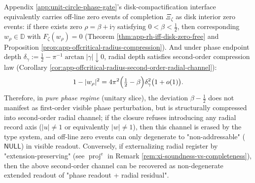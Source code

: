 \begin{corollary}\label{cor:xi-null-second-order-radial-channel}
Appendix \ref{app:unit-circle-phase-gate}'s disk-compactification interface equivalently carries off-line zero events of completion \(\Xi_\zeta\) as disk interior zero events: if there exists zero \(\rho=\beta+\mathrm{i}\gamma\) satisfying \(0<\beta<\tfrac12\), then corresponding \(w_\rho\in\mathbb{D}\) with \(F_\zeta(w_\rho)=0\) (Theorem \ref{thm:app-rh-iff-disk-zero-free} and Proposition \ref{prop:app-offcritical-radius-compression}).
And under phase endpoint depth \(\delta_\gamma:=\tfrac12-\pi^{-1}\arctan|\gamma|\downarrow 0\), radial depth satisfies second-order compression law (Corollary \ref{cor:app-offcritical-radius-second-order-radial-channel}):
\[
1-|w_\rho|^{2}=4\pi^{2}\Bigl(\tfrac12-\beta\Bigr)\delta_\gamma^{2}\bigl(1+o(1)\bigr).
\]
Therefore, in \emph{pure phase regime} (unitary slice), the deviation \(\beta-\tfrac12\) does not manifest as first-order visible phase perturbation, but is structurally compressed into second-order radial channel; if the closure refuses introducing any radial record axis (\(|u|\neq 1\) or equivalently \(|w|\neq 1\)), then this channel is erased by the type system, and off-line zero events can only degenerate to "non-addressable" (\(\mathsf{NULL}\)) in visible readout.
Conversely, if externalizing radial register by "extension-preserving" (see \(\operatorname{proj}^{\mathrm e}\) in Remark \ref{rem:xi-soundness-vs-completeness}), then the above second-order channel can be recovered as non-degenerate extended readout of "phase readout + radial residual".
\end{corollary}

